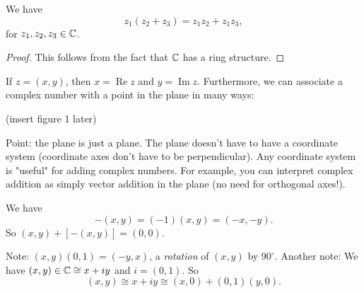 \begin{theorem}
   We have \[
       z_1(z_2+z_3)=z_1z_2+z_1z_3,
   \]
   for $z_1,z_2,z_3 \in \mathbb{C}$. 
\end{theorem}
\begin{proof}
    This follows from the fact that $\mathbb{C}$ has a ring structure.
\end{proof}

\begin{definition}
    If $z=(x,y)$, then $x=\operatorname{Re}z$ and $y=\operatorname{Im}z.$ Furthermore, we can associate a complex number with a point in the plane in many ways:
\end{definition}
(insert figure 1 later)

\vspace{3mm}

Point: the plane is just a plane. The plane doesn't have to have a coordinate system (coordinate axes don't have to be perpendicular). Any coordinate system is "useful" for adding complex numbers. For example, you can interpret complex addition as simply vector addition in the plane (no need for orthogonal axes!).

\begin{definition}
    We have \[
        -(x,y)=(-1)(x,y)=(-x,-y).
    \]
    So $(x,y)+[-(x,y)]=(0,0)$.
\end{definition}

Note: $(x,y)(0,1)=(-y,x)$, a \textit{rotation} of $(x,y)$ by $90^{\circ}$.
Another note: We have $(x,y)\in\mathbb{C} \cong x+iy$ and $i=(0,1).$ So 
\[
(x,y) \cong x+iy \cong (x,0)+(0,1)(y,0).
\]
